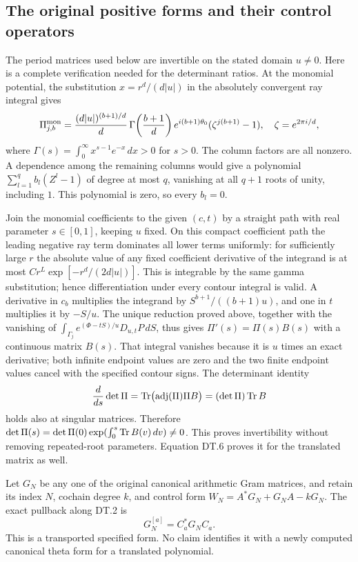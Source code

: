 \subsection{The original positive forms and their control operators}
The period matrices used below are invertible on the stated domain
\(u\ne0\). Here is a complete verification needed for the determinant
ratios. At the monomial potential, the substitution
\(x=r^d/(d|u|)\) in the absolutely convergent ray integral gives
\[
 \Pi^{\rm mon}_{j,b}
 =\frac{(d|u|)^{(b+1)/d}}d\,
   \Gamma\!\left(\frac{b+1}{d}\right)e^{i(b+1)\theta_0}
   (\zeta^{j(b+1)}-1),\quad \zeta=e^{2\pi i/d},
\]
where \(\Gamma(s)=\int_0^\infty x^{s-1}e^{-x}\,dx>0\) for
\(s>0\). The column factors are all nonzero. A dependence among
the remaining columns would give a polynomial
\(\sum_{l=1}^q b_l(Z^l-1)\) of degree at most \(q\), vanishing
at all \(q+1\) roots of unity, including \(1\). This polynomial
is zero, so every \(b_l=0\).

Join the monomial coefficients to the given \((c,t)\) by a straight
path with real parameter \(s\in[0,1]\), keeping \(u\) fixed.
On this compact coefficient path the leading negative ray term
dominates all lower terms uniformly: for sufficiently large \(r\)
the absolute value of any fixed coefficient derivative of the
integrand is at most \(Cr^L\exp[-r^d/(2d|u|)]\).
This is integrable by the same gamma substitution; hence
differentiation under every contour integral is valid. A derivative
in \(c_b\) multiplies the integrand by
\(S^{b+1}/((b+1)u)\), and one in \(t\) multiplies it by \(-S/u\).
The unique reduction proved above, together with the vanishing of
\(\int_{\Gamma_j}e^{(\Phi-tS)/u}D_{u,t}P\,dS\), thus gives
\(\Pi'(s)=\Pi(s)B(s)\) with a continuous matrix \(B(s)\).
That integral vanishes because it is \(u\) times an exact derivative;
both infinite endpoint values are zero and the two finite endpoint
values cancel with the specified contour signs. The determinant
identity
\[
 \frac d{ds}\det\Pi
 =\operatorname{Tr}\bigl(\operatorname{adj}(\Pi)\Pi B\bigr)
 =(\det\Pi)\operatorname{Tr} B
\]
holds also at singular matrices. Therefore
\(\det\Pi(s)=\det\Pi(0)\exp(\int_0^s\operatorname{Tr} B(v)\,dv)\ne0\).
This proves invertibility without removing repeated-root parameters.
Equation DT.6 proves it for the translated matrix as well.

Let \(G_N\) be any one of the original canonical arithmetic Gram
matrices, and retain its index \(N\), cochain degree \(k\), and control
form \(W_N=A^*G_N+G_NA-kG_N\). The exact pullback along DT.2 is
\begin{equation}\tag{DT.7}
 G_N^{[a]}=C_a^*G_NC_a.
\end{equation}
This is a transported specified form. No claim identifies it with a
newly computed canonical theta form for a translated polynomial.

